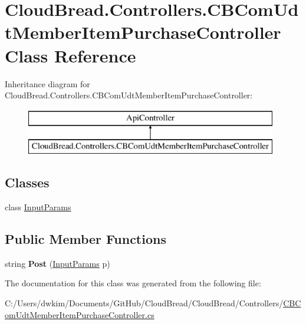 \hypertarget{class_cloud_bread_1_1_controllers_1_1_c_b_com_udt_member_item_purchase_controller}{}\section{Cloud\+Bread.\+Controllers.\+C\+B\+Com\+Udt\+Member\+Item\+Purchase\+Controller Class Reference}
\label{class_cloud_bread_1_1_controllers_1_1_c_b_com_udt_member_item_purchase_controller}
Inheritance diagram for Cloud\+Bread.\+Controllers.\+C\+B\+Com\+Udt\+Member\+Item\+Purchase\+Controller\+:\begin{figure}[H]
\begin{center}
\leavevmode
\includegraphics[height=2.000000cm]{class_cloud_bread_1_1_controllers_1_1_c_b_com_udt_member_item_purchase_controller}
\end{center}
\end{figure}
\subsection*{Classes}
\begin{DoxyCompactItemize}
\item 
class \hyperlink{class_cloud_bread_1_1_controllers_1_1_c_b_com_udt_member_item_purchase_controller_1_1_input_params}{Input\+Params}
\end{DoxyCompactItemize}
\subsection*{Public Member Functions}
\begin{DoxyCompactItemize}
\item 
string {\bfseries Post} (\hyperlink{class_cloud_bread_1_1_controllers_1_1_c_b_com_udt_member_item_purchase_controller_1_1_input_params}{Input\+Params} p)\hypertarget{class_cloud_bread_1_1_controllers_1_1_c_b_com_udt_member_item_purchase_controller_a53e122e0ccbeb2b8991758b8bb1933d9}{}\label{class_cloud_bread_1_1_controllers_1_1_c_b_com_udt_member_item_purchase_controller_a53e122e0ccbeb2b8991758b8bb1933d9}

\end{DoxyCompactItemize}


The documentation for this class was generated from the following file\+:\begin{DoxyCompactItemize}
\item 
C\+:/\+Users/dwkim/\+Documents/\+Git\+Hub/\+Cloud\+Bread/\+Cloud\+Bread/\+Controllers/\hyperlink{_c_b_com_udt_member_item_purchase_controller_8cs}{C\+B\+Com\+Udt\+Member\+Item\+Purchase\+Controller.\+cs}\end{DoxyCompactItemize}
